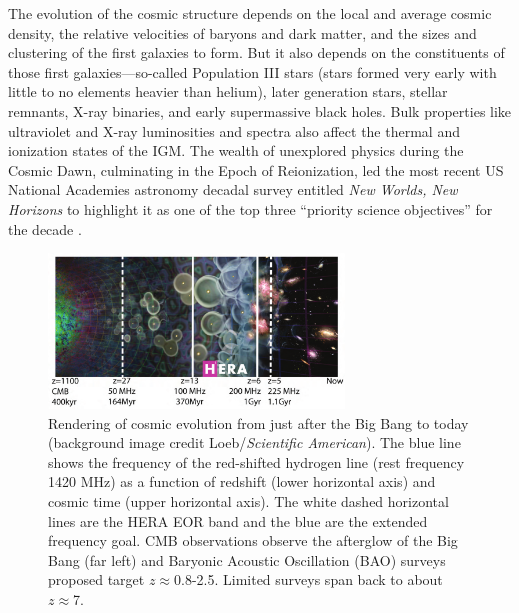 \documentclass[preprint,11pt]{aastex}
\begin{document}
The evolution of the cosmic structure depends on the local and average cosmic density, the relative velocities of
baryons and dark matter, and the sizes and clustering of the first galaxies to form.
But it also depends on the constituents of those first galaxies---so-called Population
III stars (stars formed very early with little to no elements heavier than helium), later generation stars, stellar remnants, X-ray binaries,
and early supermassive black holes.  Bulk properties like
ultraviolet and X-ray luminosities and spectra also affect the thermal and
ionization states of the IGM.  The wealth of unexplored physics during the Cosmic Dawn,
culminating in the Epoch of Reionization, 
led the most recent US National Academies astronomy decadal survey entitled {\em New Worlds, New Horizons} to highlight it as one of the top three ``priority science objectives'' for
the decade \citep{NWNH}.

\begin{figure}[h!]
	\centering
	\includegraphics[width=0.7\textwidth]{plots/cosmicEvo.pdf}
	\caption{Rendering of cosmic evolution from just after the Big Bang to today (background image credit Loeb/{\em Scientific American}).  The blue line shows the frequency of the red-shifted hydrogen line (rest frequency 1420 MHz) as a function of redshift (lower horizontal axis) and cosmic time (upper horizontal axis).  The white dashed horizontal lines are the HERA EOR band and the blue are the extended frequency goal.  %
CMB observations observe the afterglow of the Big Bang (far left) and Baryonic Acoustic Oscillation (BAO) surveys proposed 
target $z\approx$0.8-2.5.  Limited surveys span back to about $z\approx$7.} 
	\label{fig:cosmos}
\end{figure}
\end{document}
